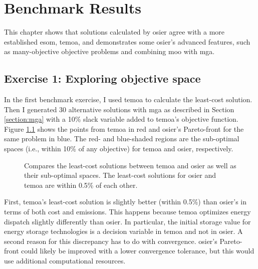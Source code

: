 \chapter{Benchmark Results}
\label{chapter:benchmark-results}

This chapter shows that solutions calculated by \ac{osier} agree with a more
established \ac{esom}, \ac{temoa}, and demonstrates some \ac{osier}'s advanced
features, such as many-objective objective problems and combining \ac{moo} with
\ac{mga}.

\section{Exercise 1: Exploring objective space}
In the first benchmark exercise, I used \ac{temoa} to calculate the least-cost
solution. Then I generated 30 alternative solutions with \ac{mga} as described
in Section \ref{section:mga} with a 10\% slack variable added to \ac{temoa}'s
objective function. Figure \ref{fig:temoa-benchmark-01} shows the points from
\ac{temoa} in red and \ac{osier}'s Pareto-front for the same problem in blue.
The red- and blue-shaded regions are the sub-optimal spaces (i.e., within 10\%
of any objective) for \ac{temoa} and \ac{osier}, respectively.

\begin{figure}[h]
  \centering
  \resizebox{0.6\columnwidth}{!}{}
  \caption{Compares the least-cost solutions between \acs{temoa}
  and \acs{osier} as well as their sub-optimal spaces. The least-cost solutions
  for \ac{osier} and \ac{temoa} are within 0.5\% of each other.}
  \label{fig:temoa-benchmark-01}
\end{figure}

First, \ac{temoa}'s least-cost solution is slightly better (within 0.5\%) than
\ac{osier}'s in terms of both cost and emissions. This happens because
\ac{temoa} optimizes energy dispatch slightly differently than \ac{osier}. In
particular, the initial storage value for energy storage technologies is a
decision variable in \ac{temoa} and not in \ac{osier}. A second reason for this
discrepancy has to do with convergence. \ac{osier}'s Pareto-front could likely
be improved with a lower convergence tolerance, but this would use additional
computational resources.

